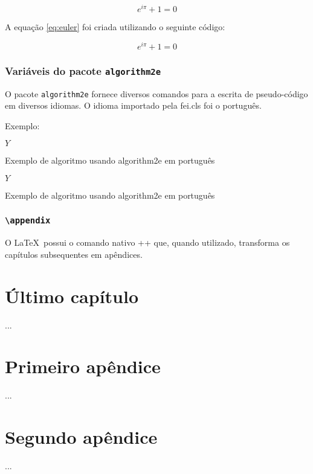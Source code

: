 \documentclass{fei}
\begin{document}
	\begin{equation} \label{eq:euler}
	e^{i\pi}+1=0
	\end{equation}
	
	A equação \eqref{eq:euler} foi criada utilizando o seguinte código:
	
	\begin{latexcode}
	\begin{equation} \label{eq:euler}
	e^{i\pi}+1=0
	\end{equation}	
	\end{latexcode}
    
    \subsection{Variáveis do pacote \texttt{algorithm2e}}
    
    O pacote \texttt{algorithm2e} fornece diversos comandos para a escrita de pseudo-código em diversos idiomas. O idioma importado pela fei.cls foi o português.
    
    Exemplo:

\begin{latexcode}
\begin{algorithm}
	\Retorna \(Y\)
	\caption{Exemplo de algoritmo usando algorithm2e em português}
	\label{lst:alg}
\end{algorithm}
\end{latexcode}
    
\begin{algorithm}


\Retorna \(Y\)

\caption{Exemplo de algoritmo usando algorithm2e em português}
\label{lst:alg}
\end{algorithm}

	\subsection{\texttt{\textbackslash appendix}}
	
	O \LaTeX\ possui o comando nativo \latexinline+\appendix+ que, quando utilizado, transforma os capítulos subsequentes em apêndices.
	
	\begin{latexcode}
	\chapter{Último capítulo}
	...
	\appendix
	\chapter{Primeiro apêndice}
	...
	\chapter{Segundo apêndice}
	...
	\end{latexcode}
	
\end{document}
